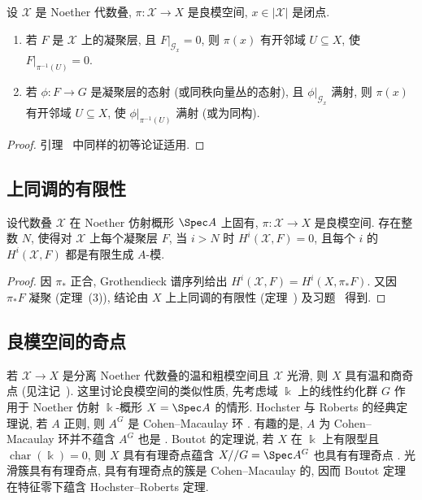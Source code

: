 \begin{lemma}\label{src:7.5.37}
设 $\mathcal X$ 是 Noether 代数叠, $\pi:\mathcal X\to X$ 是良模空间, $x\in|\mathcal X|$ 是闭点.
\begin{enumerate}[(1)]
\item 若 $F$ 是 $\mathcal X$ 上的凝聚层, 且 $F|_{\mathcal G_x}=0$, 则 $\pi(x)$ 有开邻域 $U\subseteq X$, 使 $F|_{\pi^{-1}(U)}=0$.
\item 若 $\phi:F\to G$ 是凝聚层的态射 (或同秩向量丛的态射), 且 $\phi|_{\mathcal G_x}$ 满射, 则 $\pi(x)$ 有开邻域 $U\subseteq X$, 使 $\phi|_{\pi^{-1}(U)}$ 满射 (或为同构).
\end{enumerate}
\end{lemma}
\begin{proof}
引理~ 中同样的初等论证适用.
\end{proof}

\subsection{上同调的有限性}\label{src:7.5.10-subsection}
\begin{proposition}\label{src:7.5.38}
设代数叠 $\mathcal X$ 在 Noether 仿射概形 $\Spec A$ 上固有, $\pi:\mathcal X\to X$ 是良模空间. 存在整数 $N$, 使得对 $\mathcal X$ 上每个凝聚层 $F$, 当 $i>N$ 时 $H^i(\mathcal X,F)=0$, 且每个 $i$ 的 $H^i(\mathcal X,F)$ 都是有限生成 $A$-模.
\end{proposition}
\begin{proof}
因 $\pi_*$ 正合, Grothendieck 谱序列给出 $H^i(\mathcal X,F)=H^i(X,\pi_*F)$. 又因 $\pi_*F$ 凝聚 (定理~(3)), 结论由 $X$ 上上同调的有限性 (定理~) 及习题~ 得到.
\end{proof}

\subsection{良模空间的奇点}\label{src:7.5.11-subsection}
若 $\mathcal X\to X$ 是分离 Noether 代数叠的温和粗模空间且 $\mathcal X$ 光滑, 则 $X$ 具有温和商奇点 (见注记~). 这里讨论良模空间的类似性质, 先考虑域 $\Bbbk$ 上的线性约化群 $G$ 作用于 Noether 仿射 $\Bbbk$-概形 $X=\Spec A$ 的情形. Hochster 与 Roberts 的经典定理说, 若 $A$ 正则, 则 $A^G$ 是 Cohen--Macaulay 环 \cite{HR74}. 有趣的是, $A$ 为 Cohen--Macaulay 环并不蕴含 $A^G$ 也是 \cite[例 2.1]{HR74}. Boutot 的定理说, 若 $X$ 在 $\Bbbk$ 上有限型且 $\operatorname{char}(\Bbbk)=0$, 则 $X$ 具有有理奇点蕴含 $X//G=\Spec A^G$ 也具有有理奇点 \cite{Bou87}. 光滑簇具有有理奇点, 具有有理奇点的簇是 Cohen--Macaulay 的, 因而 Boutot 定理在特征零下蕴含 Hochster--Roberts 定理.

